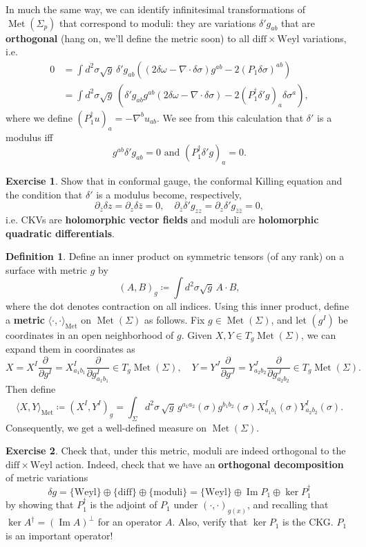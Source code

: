 \documentclass{report}
\theoremstyle{plain}
\theoremstyle{definition}
\newtheorem{definition}[theorem]{Definition}
\newtheorem{exercise}{Exercise}[section]
\theoremstyle{remark}
\newcommand{\di}{\partial}
\newcommand{\diff}{\mathrm{diff}}
\newcommand{\Weyl}{\mathrm{Weyl}}
\DeclareMathOperator{\im}{Im}
\DeclareMathOperator{\Met}{Met}
\newcommand{\pder}[2]{\frac{\partial #1}{\partial #2}}
\newcommand{\bz}{\bar{z}}
\begin{document}
In much the same way, we can identify infinitesimal transformations of
$\Met(\Sigma_p)$ that correspond to moduli: they are variations
$\delta' g_{ab}$ that are {\bf orthogonal} (hang on, we'll define the
metric soon) to all $\diff \times \Weyl$ variations, i.e.
\begin{align*}
  0
  &= \int d^2\sigma \sqrt{g} \, \delta' g_{ab} \left((2\delta \omega - \nabla \cdot \delta \sigma) g^{ab} - 2(P_1 \delta \sigma)^{ab}\right) \\
  &= \int d^2\sigma \sqrt{g} \, \left(\delta' g_{ab} g^{ab}(2\delta \omega - \nabla \cdot \delta \sigma) - 2(P_1^\dag \delta' g)_a \delta \sigma^a\right),
\end{align*}
where we define $(P_1^\dag u)_a = -\nabla^b u_{ab}$. We see from this
calculation that $\delta'$ is a modulus iff
\[ g^{ab}\delta' g_{ab} = 0 \text{ and } (P_1^\dag \delta' g)_a = 0. \]

\begin{exercise}
  Show that in conformal gauge, the conformal Killing equation and the
  condition that $\delta'$ is a modulus become, respectively,
  \[ \di_{\bz} \delta z = \di_z \delta \bz = 0, \quad \di_{\bz} \delta' g_{zz} = \di_z \delta' g_{\bz\bz} = 0, \]
  i.e. CKVs are {\bf holomorphic vector fields} and moduli are {\bf
    holomorphic quadratic differentials}.
\end{exercise}

\begin{definition}
  Define an inner product on symmetric tensors (of any rank) on a
  surface with metric $g$ by
  \[ (A, B)_g \coloneqq \int d^2\sigma \sqrt{g} \, A \cdot B, \]
  where the dot denotes contraction on all indices. Using this inner
  product, define a {\bf metric} $\langle \cdot, \cdot \rangle_{\Met}$
  on $\Met(\Sigma)$ as follows. Fix $g \in \Met(\Sigma)$, and let
  $(g^I)$ be coordinates in an open neighborhood of $g$. Given $X, Y
  \in T_g\Met(\Sigma)$, we can expand them in coordinates as
  \[ X = X^I \pder{}{g^I} = X^I_{a_1b_1} \pder{}{g^I_{a_1b_1}} \in T_g\Met(\Sigma), \quad Y = Y^J \pder{}{g^J} = Y^J_{a_2b_2} \pder{}{g^J_{a_2b_2}} \in T_g\Met(\Sigma). \]
  Then define
  \[ \langle X, Y \rangle_{\Met} \coloneqq (X^I, Y^I)_g = \int_\Sigma d^2\sigma \, \sqrt{g} \, g^{a_1a_2}(\sigma) g^{b_1b_2}(\sigma) X^I_{a_1b_1}(\sigma) Y^I_{a_2b_2}(\sigma). \]
  Consequently, we get a well-defined measure on $\Met(\Sigma)$.
\end{definition}

\begin{exercise}
  Check that, under this metric, moduli are indeed orthogonal to the
  $\diff \times \Weyl$ action. Indeed, check that we have an {\bf
    orthogonal decomposition} of metric variations
  \[ \delta g = \{\Weyl\} \oplus \{\diff\} \oplus \{\text{moduli}\} = \{\Weyl\} \oplus \im P_1 \oplus \ker P_1^\dag \]
  by showing that $P_1^\dag$ is the adjoint of $P_1$ under $(\cdot,
  \cdot)_{g(x)}$, and recalling that $\ker A^\dag = (\im A)^\perp$ for
  an operator $A$. Also, verify that $\ker P_1$ is the CKG. $P_1$ is
  an important operator!
\end{exercise}
\end{document}

